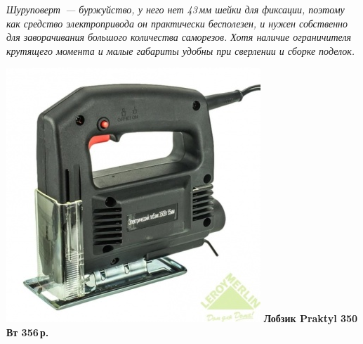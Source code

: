 {\emph{Шуруповерт\ --- буржуйство, у него нет 43\,мм шейки для фиксации, поэтому
как средство электропривода он практически бесполезен, и нужен собственно для
заворачивания большого количества саморезов. Хотя наличие ограничителя
крутящего момента и малые габариты удобны при сверлении и сборке поделок.}


\begin{multicols}{2}
\noindent\href{http://leroymerlin.ru/catalogue/instrumenty/elektroinstrument/lobziki/13805991/}{
\includegraphics[width=\columnwidth]{00/fig/LobzPraktyl.jpg}}
\textbf{Лобзик Praktyl 350 Вт 356\,р.}

\columnbreak


\end{multicols}}

